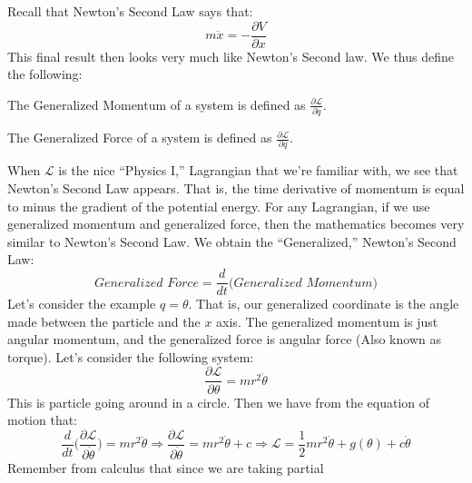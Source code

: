 \documentclass[crop=false,class=article,oneside]{standalone}
\begin{document}
    Recall that Newton's Second Law says that:
    \begin{equation*}
        m\ddot{x}=-\frac{\partial{V}}{\partial{x}}    
    \end{equation*}
    This final result then looks very
    much like Newton's Second law.
    We thus define the following:
    \begin{definition}
        The Generalized Momentum of a system is
        defined as $\frac{\partial\mathcal{L}}{\partial\dot{q}}$.
    \end{definition}
    \begin{definition}
        The Generalized Force of a system is defined as
        $\frac{\partial\mathcal{L}}{\partial q}$.
    \end{definition}
    When $\mathcal{L}$ is the nice ``Physics I,''
    Lagrangian that we're familiar with,
    we see that Newton's Second Law appears.
    That is, the time derivative of momentum is equal
    to minus the gradient of the potential energy.
    For any Lagrangian, if we use generalized momentum
    and generalized force, then the mathematics becomes
    very similar to Newton's Second Law.
    We obtain the ``Generalized,'' Newton's Second Law:
    \begin{equation*}
        \textit{Generalized Force}
        =
        \frac{d}{dt}\big(
            \textit{Generalized Momentum}
        \big)
    \end{equation*}
    Let's consider the example $q=\theta$.
    That is, our generalized coordinate is the angle
    made between the particle and the $x$ axis.
    The generalized momentum is just angular momentum,
    and the generalized force is angular force
    (Also known as torque). Let's consider the
    following system:
    \begin{equation*}
        \frac{\partial\mathcal{L}}{\partial\theta}
        =mr^{2}\ddot{\theta}
    \end{equation*}
    This is particle going around in a circle.
    Then we have from the equation of motion that:
    \begin{equation*}
        \frac{d}{dt}\big(
            \frac{\partial\mathcal{L}}{\partial\dot{\theta}}
        \big)
        =mr^{2}\ddot{\theta}
        \Rightarrow
        \frac{\partial\mathcal{L}}{\partial\dot{\theta}}
        =mr^{2}\dot{\theta}+c
        \Rightarrow
        \mathcal{L}
        =\frac{1}{2}mr^2\dot{\theta}+g(\theta)+c\dot{\theta}
    \end{equation*}
    Remember from calculus that since we are taking partial
\end{document}
